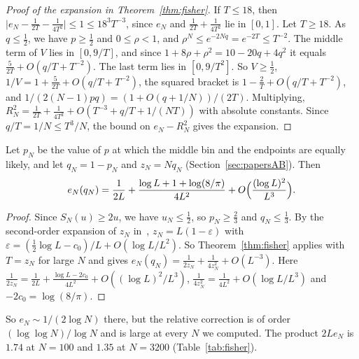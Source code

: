 \begin{proof}[Proof of the expansion in Theorem~\ref{thm:fisher}]
If $T\le18$, then $\lvert e_N-\frac1{2T}-\frac1{4T^2}\rvert\le1\le18^3T^{-3}$,
since $e_N$ and $\frac1{2T}+\frac1{4T^2}$ lie in $[0,1]$. Let $T\ge18$. As $q\le\frac12$, we have $p\ge\frac12$
and $0\le\rho<1$, and $\rho^N\le e^{-2Nq}=e^{-2T}\le T^{-2}$. The middle term of $V$ lies
in $[0,9/T]$, and since $1+8\rho+\rho^2=10-20q+4q^2$ it equals
$\frac5{2T}+O(q/T+T^{-2})$. The last term lies in $[0,9/T^2]$. So
$V\ge\frac12$, $1/V=1+\frac5{2T}+O(q/T+T^{-2})$, the squared bracket is
$1-\frac2T+O(q/T+T^{-2})$, and $1/(2(N-1)pq)=(1+O(q+1/N))/(2T)$. Multiplying,
$R^2_N=\frac1{2T}+\frac1{4T^2}+O(T^{-3}+q/T+1/(NT))$ with absolute
constants. Since $q/T=1/N\le T^3/N$, the bound on $e_N-R^2_N$ gives the
expansion.
\end{proof}

\begin{corollary}\label{cor:fisher-crossing}
Let $p_N$ be the value of $p$ at which the middle bin and the endpoints are
equally likely, and let $q_N=1-p_N$ and $z_N=Nq_N$
(Section~\ref{sec:papersAB}). Then
\[
 e_N(q_N)=\frac1{2L}+\frac{\log L+1+\log(8/\pi)}{4L^2}
 +O\Bigl(\frac{(\log L)^2}{L^3}\Bigr).
\]
\end{corollary}

\begin{proof}
Since $S_N(u)\ge2u$, we have $u_N\le\frac12$, so $p_N\ge\frac23$ and
$q_N\le\frac13$. By the second-order expansion of $z_N$ in~\cite{paperA},
$z_N=L(1-\varepsilon)$ with
$\varepsilon=(\frac12\log L-c_0)/L+O(\log L/L^2)$. So Theorem~\ref{thm:fisher}
applies with $T=z_N$ for large $N$ and gives
$e_N(q_N)=\frac1{2z_N}+\frac1{4z_N^2}+O(L^{-3})$. Here
$\frac1{2z_N}=\frac1{2L}+\frac{\log L-2c_0}{4L^2}+O((\log L)^2/L^3)$,
$\frac1{4z_N^2}=\frac1{4L^2}+O(\log L/L^3)$ and $-2c_0=\log(8/\pi)$.
\end{proof}

So $e_N\sim1/(2\log N)$ there, but the relative correction is of order
$(\log\log N)/\log N$ and is large at every $N$ we computed. The product
$2Le_N$ is $1.74$ at $N=100$ and $1.35$ at $N=3200$ (Table~\ref{tab:fisher}).

